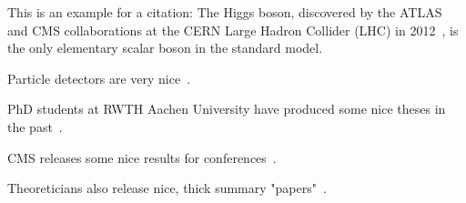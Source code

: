 \label{sec:theory}

This is an example for a citation:
The Higgs boson, discovered by the ATLAS and CMS collaborations at the CERN Large Hadron Collider (LHC) in 2012~\cite{ATLAS:2012yve,CMS:2012qbp}, is the only elementary scalar boson in the standard model.

Particle detectors are very nice~\cite{Kolanoski:2016gyf}.

PhD students at RWTH Aachen University have produced some nice theses in the past~\cite{Rieger:2019rgc}.

CMS releases some nice results for conferences~\cite{CMS-PAS-SMP-22-009}.

Theoreticians also release nice, thick summary "papers"~\cite{LHCHiggsCrossSectionWorkingGroup:2016ypw}.